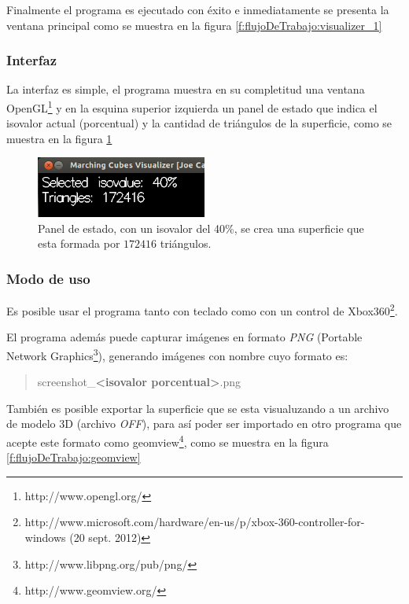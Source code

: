 Finalmente el programa es ejecutado con éxito e inmediatamente se presenta la ventana principal como se muestra en la figura \ref{f:flujoDeTrabajo:visualizer_1}

\subsubsection{Interfaz}
\label{ch:propuesta:sec:extraccionDeLaSuperficie:subsec:interfaz}

La interfaz es simple, el programa muestra en su completitud una ventana OpenGL\footnote{http://www.opengl.org/} y en la esquina superior izquierda un panel de estado que indica el isovalor actual (porcentual) y la cantidad de triángulos de la superficie, como se muestra en la figura \ref{f:flujoDeTrabajo:interface}

\begin{figure}[h]
\centering
	\includegraphics[width=0.5\textwidth]{images/visualizer/interface.png}
\caption{Panel de estado, con un isovalor del 40\%, se crea una superficie que esta formada por $172416$ triángulos.}
\label{f:flujoDeTrabajo:interface}
\end{figure}

\subsubsection{Modo de uso}
\label{ch:propuesta:sec:extraccionDeLaSuperficie:subsec:modoDeUso}

Es posible usar el programa tanto con teclado como con un control de Xbox360\textsuperscript{\textregistered}\footnote{http://www.microsoft.com/hardware/en-us/p/xbox-360-controller-for-windows (20 sept. 2012)}.

El programa además puede capturar imágenes en formato \emph{PNG} (Portable Network \mbox{Graphics}\footnote{http://www.libpng.org/pub/png/}), generando imágenes con nombre cuyo formato es:

\begin{quote}
	screenshot\_\textbf{\textless isovalor porcentual\textgreater}.png
\end{quote}

También es posible exportar la superficie que se esta visualuzando a un archivo de modelo 3D (archivo \emph{OFF}), para así poder ser importado en otro programa que acepte este formato como geomview\footnote{http://www.geomview.org/}, como se muestra en la figura \ref{f:flujoDeTrabajo:geomview}

